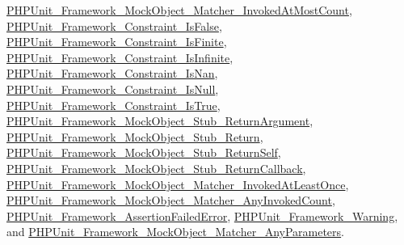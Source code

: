 \mbox{\hyperlink{class_p_h_p_unit___framework___mock_object___matcher___invoked_at_most_count_a5558c5d549f41597377fa1ea8a1cefa3}{P\+H\+P\+Unit\+\_\+\+Framework\+\_\+\+Mock\+Object\+\_\+\+Matcher\+\_\+\+Invoked\+At\+Most\+Count}}, \mbox{\hyperlink{class_p_h_p_unit___framework___constraint___is_false_a5558c5d549f41597377fa1ea8a1cefa3}{P\+H\+P\+Unit\+\_\+\+Framework\+\_\+\+Constraint\+\_\+\+Is\+False}}, \mbox{\hyperlink{class_p_h_p_unit___framework___constraint___is_finite_a5558c5d549f41597377fa1ea8a1cefa3}{P\+H\+P\+Unit\+\_\+\+Framework\+\_\+\+Constraint\+\_\+\+Is\+Finite}}, \mbox{\hyperlink{class_p_h_p_unit___framework___constraint___is_infinite_a5558c5d549f41597377fa1ea8a1cefa3}{P\+H\+P\+Unit\+\_\+\+Framework\+\_\+\+Constraint\+\_\+\+Is\+Infinite}}, \mbox{\hyperlink{class_p_h_p_unit___framework___constraint___is_nan_a5558c5d549f41597377fa1ea8a1cefa3}{P\+H\+P\+Unit\+\_\+\+Framework\+\_\+\+Constraint\+\_\+\+Is\+Nan}}, \mbox{\hyperlink{class_p_h_p_unit___framework___constraint___is_null_a5558c5d549f41597377fa1ea8a1cefa3}{P\+H\+P\+Unit\+\_\+\+Framework\+\_\+\+Constraint\+\_\+\+Is\+Null}}, \mbox{\hyperlink{class_p_h_p_unit___framework___constraint___is_true_a5558c5d549f41597377fa1ea8a1cefa3}{P\+H\+P\+Unit\+\_\+\+Framework\+\_\+\+Constraint\+\_\+\+Is\+True}}, \mbox{\hyperlink{class_p_h_p_unit___framework___mock_object___stub___return_argument_a5558c5d549f41597377fa1ea8a1cefa3}{P\+H\+P\+Unit\+\_\+\+Framework\+\_\+\+Mock\+Object\+\_\+\+Stub\+\_\+\+Return\+Argument}}, \mbox{\hyperlink{class_p_h_p_unit___framework___mock_object___stub___return_a5558c5d549f41597377fa1ea8a1cefa3}{P\+H\+P\+Unit\+\_\+\+Framework\+\_\+\+Mock\+Object\+\_\+\+Stub\+\_\+\+Return}}, \mbox{\hyperlink{class_p_h_p_unit___framework___mock_object___stub___return_self_a5558c5d549f41597377fa1ea8a1cefa3}{P\+H\+P\+Unit\+\_\+\+Framework\+\_\+\+Mock\+Object\+\_\+\+Stub\+\_\+\+Return\+Self}}, \mbox{\hyperlink{class_p_h_p_unit___framework___mock_object___stub___return_callback_a5558c5d549f41597377fa1ea8a1cefa3}{P\+H\+P\+Unit\+\_\+\+Framework\+\_\+\+Mock\+Object\+\_\+\+Stub\+\_\+\+Return\+Callback}}, \mbox{\hyperlink{class_p_h_p_unit___framework___mock_object___matcher___invoked_at_least_once_a5558c5d549f41597377fa1ea8a1cefa3}{P\+H\+P\+Unit\+\_\+\+Framework\+\_\+\+Mock\+Object\+\_\+\+Matcher\+\_\+\+Invoked\+At\+Least\+Once}}, \mbox{\hyperlink{class_p_h_p_unit___framework___mock_object___matcher___any_invoked_count_a5558c5d549f41597377fa1ea8a1cefa3}{P\+H\+P\+Unit\+\_\+\+Framework\+\_\+\+Mock\+Object\+\_\+\+Matcher\+\_\+\+Any\+Invoked\+Count}}, \mbox{\hyperlink{class_p_h_p_unit___framework___assertion_failed_error_a5558c5d549f41597377fa1ea8a1cefa3}{P\+H\+P\+Unit\+\_\+\+Framework\+\_\+\+Assertion\+Failed\+Error}}, \mbox{\hyperlink{class_p_h_p_unit___framework___warning_a5558c5d549f41597377fa1ea8a1cefa3}{P\+H\+P\+Unit\+\_\+\+Framework\+\_\+\+Warning}}, and \mbox{\hyperlink{class_p_h_p_unit___framework___mock_object___matcher___any_parameters_a5558c5d549f41597377fa1ea8a1cefa3}{P\+H\+P\+Unit\+\_\+\+Framework\+\_\+\+Mock\+Object\+\_\+\+Matcher\+\_\+\+Any\+Parameters}}.



